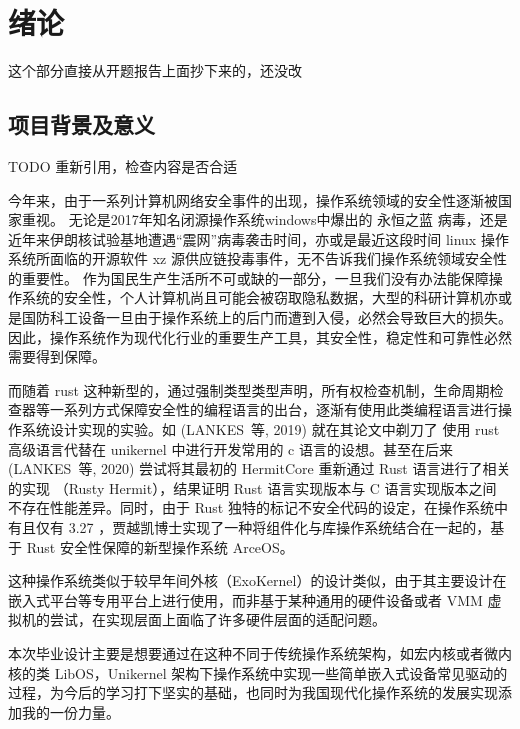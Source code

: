 \section{绪论}
这个部分直接从开题报告上面抄下来的，还没改

\subsection{项目背景及意义}
TODO 重新引用，检查内容是否合适

今年来，由于一系列计算机网络安全事件的出现，操作系统领域的安全性逐渐被国家重视。
无论是2017年知名闭源操作系统windows中爆出的 永恒之蓝 病毒，还是近年来伊朗核试验基地遭遇“震网”病毒袭击时间，亦或是最近这段时间 linux 操作系统所面临的开源软件 xz 源供应链投毒事件，无不告诉我们操作系统领域安全性的重要性。
作为国民生产生活所不可或缺的一部分，一旦我们没有办法能保障操作系统的安全性，个人计算机尚且可能会被窃取隐私数据，大型的科研计算机亦或是国防科工设备一旦由于操作系统上的后门而遭到入侵，必然会导致巨大的损失。
因此，操作系统作为现代化行业的重要生产工具，其安全性，稳定性和可靠性必然需要得到保障。

而随着 rust 这种新型的，通过强制类型类型声明，所有权检查机制，生命周期检查器等一系列方式保障安全性的编程语言的出台，逐渐有使用此类编程语言进行操作系统设计实现的实验。如 (LANKES 等, 2019) 就在其论文中剃刀了
使用 rust 高级语言代替在 unikernel 中进行开发常用的 c 语言的设想。甚至在后来(LANKES 等, 2020) 尝试将其最初的 HermitCore 重新通过 Rust 语言进行了相关的实现 （Rusty Hermit），结果证明 Rust 语言实现版本与 C 语言实现版本之间
不存在性能差异。同时，由于 Rust 独特的标记不安全代码的设定，在操作系统中有且仅有 3.27%
，贾越凯博士实现了一种将组件化与库操作系统结合在一起的，基于 Rust 安全性保障的新型操作系统 ArceOS。

这种操作系统类似于较早年间外核（ExoKernel）的设计类似，由于其主要设计在嵌入式平台等专用平台上进行使用，而非基于某种通用的硬件设备或者 VMM 虚拟机的尝试，在实现层面上面临了许多硬件层面的适配问题。

本次毕业设计主要是想要通过在这种不同于传统操作系统架构，如宏内核或者微内核的类 LibOS，Unikernel 架构下操作系统中实现一些简单嵌入式设备常见驱动的过程，为今后的学习打下坚实的基础，也同时为我国现代化操作系统的发展实现添加我的一份力量。


